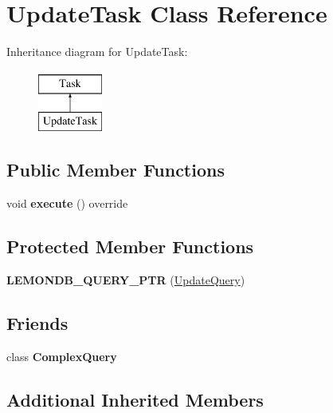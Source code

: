\hypertarget{class_update_task}{}\section{Update\+Task Class Reference}
\label{class_update_task}
Inheritance diagram for Update\+Task\+:\begin{figure}[H]
\begin{center}
\leavevmode
\includegraphics[height=2.000000cm]{class_update_task}
\end{center}
\end{figure}
\subsection*{Public Member Functions}
\begin{DoxyCompactItemize}
\item 
\mbox{\label{class_update_task_a3cb8b7e76d5c1b4a2e33915dd399c29b}} 
void {\bfseries execute} () override
\end{DoxyCompactItemize}
\subsection*{Protected Member Functions}
\begin{DoxyCompactItemize}
\item 
\mbox{\label{class_update_task_a1113f40c9793e21d7b9aad82a5b93ca6}} 
{\bfseries L\+E\+M\+O\+N\+D\+B\+\_\+\+Q\+U\+E\+R\+Y\+\_\+\+P\+TR} (\hyperlink{class_update_query}{Update\+Query})
\end{DoxyCompactItemize}
\subsection*{Friends}
\begin{DoxyCompactItemize}
\item 
\mbox{\label{class_update_task_ab608231646fe4eac3c98917bf24a5965}} 
class {\bfseries Complex\+Query}
\end{DoxyCompactItemize}
\subsection*{Additional Inherited Members}



